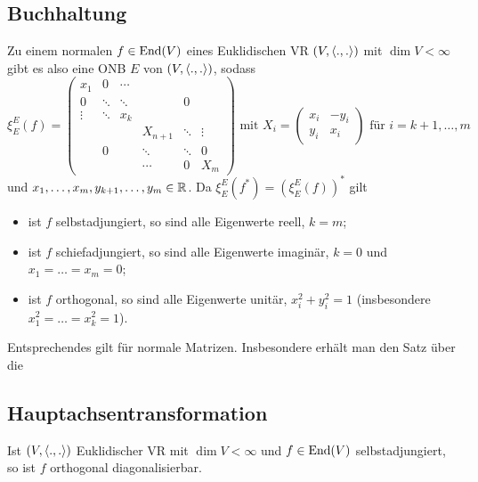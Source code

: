 \subsection{Buchhaltung}
	Zu einem normalen $ f\in \operatorname{End}(V) $ eines Euklidischen VR $ (V,\langle .,. \rangle) $ mit $ \dim V < \infty $
	gibt es also eine ONB $ E $ von $ (V,\langle .,. \rangle) $, sodass 
		\[ \xi_E^E(f) = \begin{pmatrix}
		x_1& 0&\cdots & & &\\
		0 & \ddots & \ddots& & 0& \\
		\vdots & \ddots & x_k& & &\\
		& & & X_{n+1} & \ddots & \vdots\\
		&0 & & \ddots & \ddots & 0\\
		& & & \cdots&0 & X_m
		\end{pmatrix}
		\text{ mit } X_i = \begin{pmatrix}
		x_i & -y_i\\ y_i & x_i
		\end{pmatrix} \text{ für } i=k+1,\dots,m \]
	und $ x_1,\dots,x_m,y_{k+1},\dots,y_m\in \mathbb{R} $. Da $ \xi_E^E(f^*)  = (\xi_E^E(f))^* $ gilt
		\begin{itemize}
			\item ist $ f $ selbstadjungiert, so sind alle Eigenwerte reell, $ k=m $;
			\item ist $ f $ schiefadjungiert, so sind alle Eigenwerte imaginär, $ k=0 $ und $ x_1=\dots=x_m=0 $;
			\item ist $ f $ orthogonal, so sind alle Eigenwerte unitär, $ x_i^2+y_i^2=1 $ (insbesondere $ x_1^2=\dots=x_k^2=1 $).
		\end{itemize}
	Entsprechendes gilt für normale Matrizen. Insbesondere erhält man den Satz über die
\subsection{Hauptachsentransformation}
\begin{Satz}[Hauptachsentransformation]
	Ist $ (V,\langle .,. \rangle) $ Euklidischer VR mit $ \dim V<\infty $ und $ f\in \operatorname{End}(V) $ selbstadjungiert, so ist $ f $ orthogonal diagonalisierbar.
\end{Satz}
